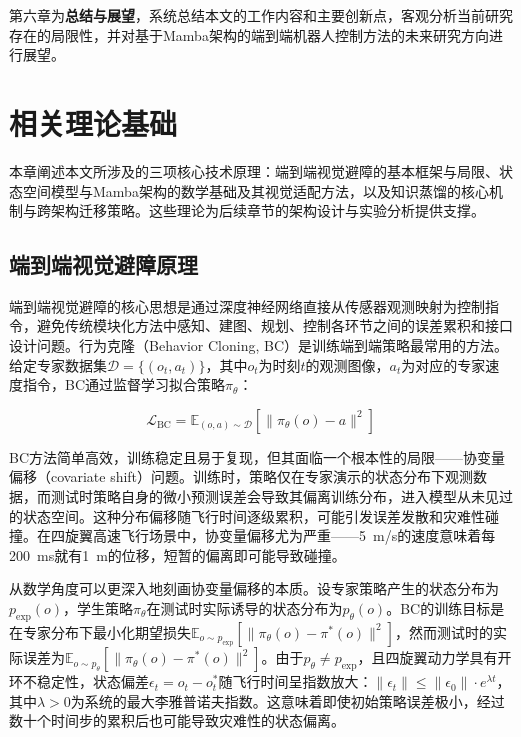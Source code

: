 \documentclass[12pt,a4paper]{article}
\makeatletter
\numberwithin{equation}{section}
\numberwithin{figure}{section}
\numberwithin{table}{section}
\newcommand{\cleardoublepage}{\clearpage\if@twoside\ifodd\c@page\else\hbox{}\thispagestyle{empty}\newpage\if@twocolumn\hbox{}\newpage\fi\fi\fi}%
\makeatother
\begin{document}
第六章为\textbf{总结与展望}，系统总结本文的工作内容和主要创新点，客观分析当前研究存在的局限性，并对基于Mamba架构的端到端机器人控制方法的未来研究方向进行展望。


\cleardoublepage
\section{相关理论基础}

本章阐述本文所涉及的三项核心技术原理：端到端视觉避障的基本框架与局限、状态空间模型与Mamba架构的数学基础及其视觉适配方法，以及知识蒸馏的核心机制与跨架构迁移策略。这些理论为后续章节的架构设计与实验分析提供支撑。

\subsection{端到端视觉避障原理}

端到端视觉避障的核心思想是通过深度神经网络直接从传感器观测映射为控制指令，避免传统模块化方法中感知、建图、规划、控制各环节之间的误差累积和接口设计问题。行为克隆（Behavior Cloning, BC）是训练端到端策略最常用的方法。给定专家数据集$\mathcal{D} = \{(o_t, a_t)\}$，其中$o_t$为时刻$t$的观测图像，$a_t$为对应的专家速度指令，BC通过监督学习拟合策略$\pi_\theta$：

\begin{equation}
\mathcal{L}_{\text{BC}} = \mathbb{E}_{(o,a) \sim \mathcal{D}}\left[\|\pi_\theta(o) - a\|^2\right]
\label{eq:bc_loss}
\end{equation}

BC方法简单高效，训练稳定且易于复现，但其面临一个根本性的局限——协变量偏移（covariate shift）问题。训练时，策略仅在专家演示的状态分布下观测数据，而测试时策略自身的微小预测误差会导致其偏离训练分布，进入模型从未见过的状态空间。这种分布偏移随飞行时间逐级累积，可能引发误差发散和灾难性碰撞。在四旋翼高速飞行场景中，协变量偏移尤为严重——5~m/s的速度意味着每200~ms就有1~m的位移，短暂的偏离即可能导致碰撞。

从数学角度可以更深入地刻画协变量偏移的本质。设专家策略产生的状态分布为$p_{\text{exp}}(o)$，学生策略$\pi_\theta$在测试时实际诱导的状态分布为$p_{\theta}(o)$。BC的训练目标是在专家分布下最小化期望损失$\mathbb{E}_{o \sim p_{\text{exp}}}[\|\pi_\theta(o) - \pi^*(o)\|^2]$，然而测试时的实际误差为$\mathbb{E}_{o \sim p_{\theta}}[\|\pi_\theta(o) - \pi^*(o)\|^2]$。由于$p_{\theta} \neq p_{\text{exp}}$，且四旋翼动力学具有开环不稳定性，状态偏差$\epsilon_t = o_t - o_t^*$随飞行时间呈指数放大：$\|\epsilon_t\| \leq \|\epsilon_0\| \cdot e^{\lambda t}$，其中$\lambda > 0$为系统的最大李雅普诺夫指数。这意味着即使初始策略误差极小，经过数十个时间步的累积后也可能导致灾难性的状态偏离。
\end{document}
